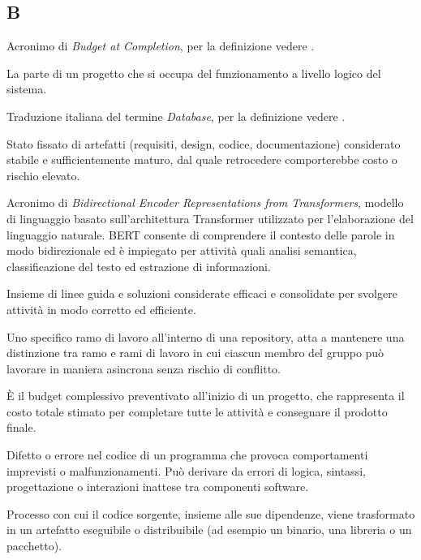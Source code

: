 \begin{center}
\section*{B}
\end{center}

Acronimo di \textit{Budget at Completion}, per la definizione vedere .

La parte di un progetto che si occupa del funzionamento a livello logico del sistema.

Traduzione italiana del termine \textit{Database}, per la definizione vedere .

Stato fissato di artefatti (requisiti, design, codice, documentazione) considerato stabile e sufficientemente maturo, dal quale retrocedere comporterebbe costo o rischio elevato.

Acronimo di \textit{Bidirectional Encoder Representations from Transformers}, modello di linguaggio basato sull’architettura Transformer utilizzato per l’elaborazione del linguaggio naturale. BERT consente di comprendere il contesto delle parole in modo bidirezionale ed è impiegato per attività quali analisi semantica, classificazione del testo ed estrazione di informazioni.

Insieme di linee guida e soluzioni considerate efficaci e consolidate per svolgere attività in modo corretto ed efficiente.

Uno specifico ramo di lavoro all'interno di una repository, atta a mantenere una distinzione tra ramo  e rami di lavoro in cui ciascun membro del gruppo può lavorare in maniera asincrona senza rischio di conflitto.

È il budget complessivo preventivato all'inizio di un progetto, che rappresenta il costo totale stimato per completare tutte le attività e consegnare il prodotto finale.

Difetto o errore nel codice di un programma che provoca comportamenti imprevisti o malfunzionamenti. Può derivare da errori di logica, sintassi, progettazione o interazioni inattese tra componenti software.

Processo con cui il codice sorgente, insieme alle sue dipendenze, viene trasformato in un artefatto eseguibile o distribuibile (ad esempio un binario, una libreria o un pacchetto).

